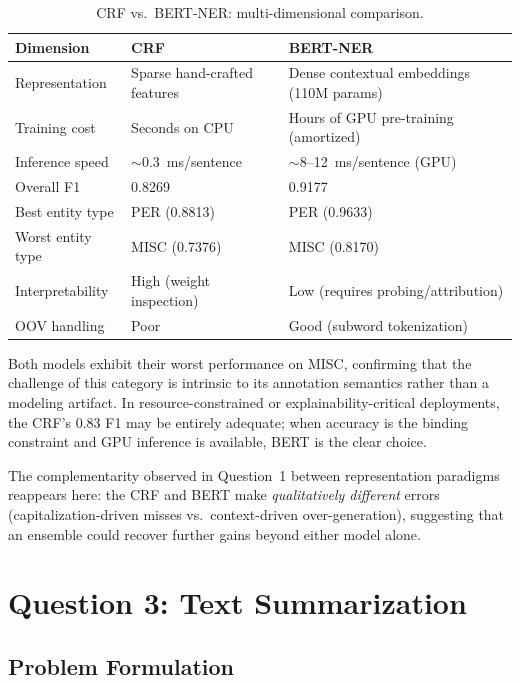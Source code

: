 \documentclass[11pt,a4paper]{article}
\begin{document}
\begin{table}[H]
\centering
\caption{CRF vs.\ BERT-NER: multi-dimensional comparison.}
\label{tab:q2-comparison}
\begin{tabular}{p{}p{}p{}}
\toprule
\textbf{Dimension} & \textbf{CRF} & \textbf{BERT-NER} \\
\midrule
Representation    & Sparse hand-crafted features &
                    Dense contextual embeddings (110M params) \\
Training cost     & Seconds on CPU &
                    Hours of GPU pre-training (amortized) \\
Inference speed   & ${\sim}$0.3~ms/sentence &
                    ${\sim}$8--12~ms/sentence (GPU) \\
Overall F1        & 0.8269 & 0.9177 \\
Best entity type  & PER (0.8813) & PER (0.9633) \\
Worst entity type & MISC (0.7376) & MISC (0.8170) \\
Interpretability  & High (weight inspection) &
                    Low (requires probing/attribution) \\
OOV handling      & Poor & Good (subword tokenization) \\
\bottomrule
\end{tabular}
\end{table}

Both models exhibit their worst performance on MISC, confirming that the
challenge of this category is intrinsic to its annotation semantics rather than
a modeling artifact. In resource-constrained or explainability-critical
deployments, the CRF's 0.83 F1 may be entirely adequate; when accuracy is the
binding constraint and GPU inference is available, BERT is the clear choice.

The complementarity observed in Question~1 between representation paradigms
reappears here: the CRF and BERT make \emph{qualitatively different} errors
(capitalization-driven misses vs.\ context-driven over-generation), suggesting
that an ensemble could recover further gains beyond either model alone.

\section{Question 3: Text Summarization}
\subsection{Problem Formulation}
\end{document}
